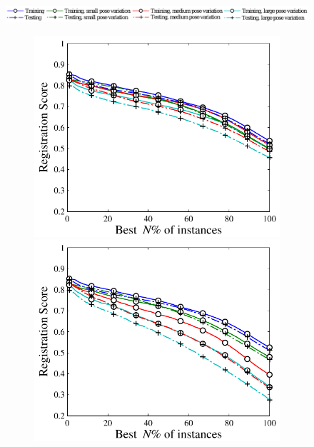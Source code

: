 \begin{figure}[ht]
	\centering 
	\includegraphics[width=1\linewidth]{fig/reg/reg2d_legend.pdf}
	\begin{subfigure}[b]{0.48\linewidth}
		\includegraphics[width=\linewidth]{fig/reg/reg2d_simsim.pdf}
		\includegraphics[width=\linewidth]{fig/reg/reg2d_simaff.pdf}
	\end{subfigure}

\end{figure}
